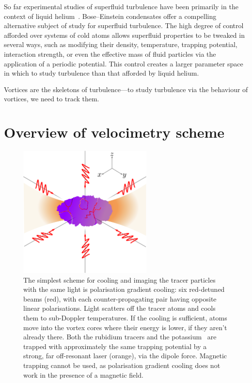 So far experimental studies of superfluid turbulence have been primarily in the context of liquid helium~\cite{leggett_superfluidity_1999}. Bose--Einstein condensates offer a compelling alternative subject of study for superfluid turbulence. The high degree of control afforded over systems of cold atoms allows superfluid properties to be tweaked in several ways, such as modifying their density, temperature, trapping potential, interaction strength, or even the effective mass of fluid particles via the application of a periodic potential. This control creates a larger parameter space in which to study turbulence than that afforded by liquid helium.

Vortices are the skeletons of turbulence---to study turbulence via the behaviour of vortices, we need to track them.

\section{Overview of velocimetry scheme}

\begin{figure}
\begin{center}
\includegraphics[width=0.6\textwidth]{figures/unsorted/setup.png}
\caption{\label{fig:setup}The simplest scheme for cooling and imaging the tracer particles with the same light is polarisation gradient cooling: six red-detuned beams (red), with each counter-propagating pair having opposite linear polarisations. Light scatters off the tracer atoms and cools them to sub-Doppler temperatures. If the cooling is sufficient, atoms move into the vortex cores where their energy is lower, if they aren't already there. Both the rubidium tracers and the potassium \bec\ are trapped with approximately the same trapping potential by a strong, far off-resonant laser (orange), via the dipole force. Magnetic trapping cannot be used, as polarisation gradient cooling does not work in the presence of a magnetic field.}
\end{center}
\end{figure}


